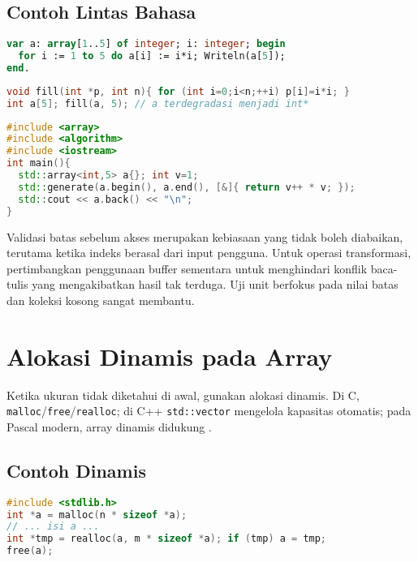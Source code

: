 \documentclass[../main.tex]{subfiles}
\begin{document}
\subsection{Contoh Lintas Bahasa}
\begin{lstlisting}[language=Pascal, caption={Array tetap di Pascal}]
var a: array[1..5] of integer; i: integer; begin
  for i := 1 to 5 do a[i] := i*i; Writeln(a[5]);
end.
\end{lstlisting}

\begin{lstlisting}[language=C, caption={Array C dan degradasi ke pointer}]
void fill(int *p, int n){ for (int i=0;i<n;++i) p[i]=i*i; }
int a[5]; fill(a, 5); // a terdegradasi menjadi int*
\end{lstlisting}

\begin{lstlisting}[language=C++, caption={std::array dan algoritme}]
#include <array>
#include <algorithm>
#include <iostream>
int main(){
  std::array<int,5> a{}; int v=1;
  std::generate(a.begin(), a.end(), [&]{ return v++ * v; });
  std::cout << a.back() << "\n";
}
\end{lstlisting}

Validasi batas sebelum akses merupakan kebiasaan yang tidak boleh diabaikan, terutama ketika indeks berasal dari input pengguna. Untuk operasi transformasi, pertimbangkan penggunaan buffer sementara untuk menghindari konflik baca-tulis yang mengakibatkan hasil tak terduga. Uji unit berfokus pada nilai batas dan koleksi kosong sangat membantu.

\section{Alokasi Dinamis pada Array}
Ketika ukuran tidak diketahui di awal, gunakan alokasi dinamis. Di C, \texttt{malloc}/\texttt{free}/\texttt{realloc}; di C++ \texttt{std::vector} mengelola kapasitas otomatis; pada Pascal modern, array dinamis didukung \parencite{iso-c-draft-n1570,cpp-reference,free-pascal-docs,cpp-vector,pascal-dynarray}.

\subsection{Contoh Dinamis}
\begin{lstlisting}[language=C, caption={malloc/realloc/free di C}]
#include <stdlib.h>
int *a = malloc(n * sizeof *a);
// ... isi a ...
int *tmp = realloc(a, m * sizeof *a); if (tmp) a = tmp;
free(a);
\end{lstlisting}
\end{document}

